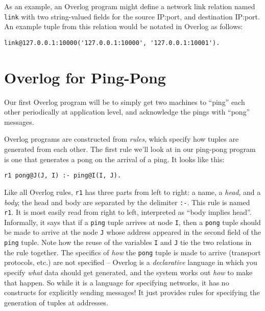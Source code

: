 \documentclass{article}
\begin{document}
As an example, an Overlog program might define a network link relation
named \lstinline$link$ with two string-valued fields for the source
IP:port, and destination IP:port.  An example tuple from this relation
would be notated in Overlog as follows:
\begin{lstlisting}
link@127.0.0.1:10000('127.0.0.1:10000', '127.0.0.1:10001').
\end{lstlisting}

\section{Overlog for Ping-Pong}
Our first Overlog program will be to simply get two machines to
``ping'' each other periodically at application level, and acknowledge
the pings with ``pong'' messages.

Overlog programs are constructed from {\em rules}, which specify how
tuples are generated from each other.  The first rule we'll look at in
our ping-pong program is one that generates a pong on the arrival of a
ping.  It looks like this:
\begin{lstlisting}
r1 pong@J(J, I) :- ping@I(I, J).
\end{lstlisting}
Like all Overlog rules, \lstinline$r1$ has three parts from left to
right: a name, a {\em head}, and a {\em body}; the head and body are
separated by the delimiter \lstinline$:-$.  This rule is named
\lstinline$r1$.  It is most easily read from right to left,
interpreted as ``body implies head''.  Informally, it says that if a
\lstinline$ping$ tuple arrives at node \lstinline$I$, then a
\lstinline$pong$ tuple should be made to arrive at the node
\lstinline$J$ whose address appeared in the second field of the
\lstinline$ping$ tuple.  Note how the reuse of the variables
\lstinline$I$ and \lstinline$J$ tie the two relations in the rule
together.  The specifics of {\em how} the \lstinline$pong$ tuple is
made to arrive (transport protocols, etc.)  are not specified
-- Overlog is a {\em declarative} language in which you specify {\em
  what} data should get generated, and the system works out {\em how} to make
that happen.  So while it is a language for specifying networks, it
has no constructs for explicitly sending messages!  It just provides
rules for specifying the generation of tuples at addresses.


\end{document}
